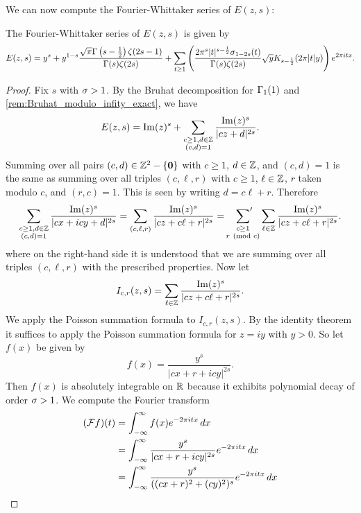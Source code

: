       We can now compute the Fourier-Whittaker series of $E(z,s)$:

      \begin{proposition}\label{prop:Fourier_coefficients_of_real-analytic_Eisenstein_series}
        The Fourier-Whittaker series of $E(z,s)$ is given by
        \[
          E(z,s) = y^{s}+y^{1-s}\frac{\sqrt{\pi}\Gamma\left(s-\frac{1}{2}\right)\zeta(2s-1)}{\Gamma(s)\zeta(2s)}+\sum_{t \ge 1}\left(\frac{2\pi^{s}|t|^{s-\frac{1}{2}}\sigma_{1-2s}(t)}{\Gamma(s)\zeta(2s)}\sqrt{y}K_{s-\frac{1}{2}}(2\pi|t|y)\right)e^{2\pi itx}.
        \]
      \end{proposition}
      \begin{proof}
        Fix $s$ with $\sigma > 1$. By the Bruhat decomposition for $\Gamma_{1}(1)$ and \cref{rem:Bruhat_modulo_infity_exact}, we have
        \[
          E(z,s) = \mathrm{Im}(z)^{s}+\sum_{\substack{c \ge 1, d \in \mathbb{Z} \\ (c,d) = 1}}\frac{\mathrm{Im}(z)^{s}}{|cz+d|^{2s}}.
        \]
        Summing over all pairs $(c,d) \in \mathbb{Z}^{2}-\{\mathbf{0}\}$ with $c \ge 1$, $d \in \mathbb{Z}$, and $(c,d) = 1$ is the same as summing over all triples $(c,\ell,r)$ with $c \ge 1$, $\ell \in \mathbb{Z}$, $r$ taken modulo $c$, and $(r,c) = 1$. This is seen by writing $d = c\ell+r$. Therefore
        \[
          \sum_{\substack{c \ge 1, d \in \mathbb{Z} \\ (c,d) = 1}}\frac{\mathrm{Im}(z)^{s}}{|cx+icy+d|^{2s}} = \sum_{(c,\ell,r)}\frac{\mathrm{Im}(z)^{s}}{|cz+c\ell+r|^{2s}} = \sideset{}{'}\sum_{\substack{c \ge 1 \\ r \ (\mathrm{mod}\text{ }c)}}\sum_{\ell \in \mathbb{Z}}\frac{\mathrm{Im}(z)^{s}}{|cz+c\ell+r|^{2s}}.
        \]
         where on the right-hand side it is understood that we are summing over all triples $(c,\ell,r)$ with the prescribed properties. Now let
        \[
          I_{c,r}(z,s) = \sum_{\ell \in \mathbb{Z}}\frac{\mathrm{Im}(z)^{s}}{|cz+c\ell+r|^{2s}}.
        \]
        We apply the Poisson summation formula to $I_{c,r}(z,s)$. By the identity theorem it suffices to apply the Poisson summation formula for $z = iy$ with $y > 0$. So let $f(x)$ be given by
        \[
          f(x) = \frac{y^{s}}{|cx+r+icy|^{2s}}.
        \]
        Then $f(x)$ is absolutely integrable on $\mathbb{R}$ because it exhibits polynomial decay of order $\sigma > 1$. We compute the Fourier transform
        \begin{align*}
          (\mc{F}f)(t) &= \int_{-\infty}^{\infty}f(x)e^{-2\pi itx}\,dx \\
          &= \int_{-\infty}^{\infty}\frac{y^{s}}{|cx+r+icy|^{2s}}e^{-2\pi itx}\,dx \\
          &= \int_{-\infty}^{\infty}\frac{y^{s}}{((cx+r)^{2}+(cy)^{2})^{s}}e^{-2\pi itx}\,dx \\

\end{align*}
\end{proof}
